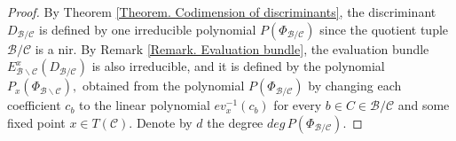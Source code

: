 \documentclass[11pt]{article}
\theoremstyle{plain}
\theoremstyle{definition}
\theoremstyle{remark}
\theoremstyle{plain}
\theoremstyle{plain}
\theoremstyle{plain}
\theoremstyle{definition}
\begin{document}
\begin{proof}
By Theorem \ref{Theorem. Codimension of discriminants}, the discriminant
$D_{\mathscr{B}/\mathscr{C}}$ is defined by one irreducible polynomial
$P(\Phi_{\mathscr{B}/\mathscr{C}})$ since the quotient tuple $\mathscr{B}/\mathscr{C}$
is a nir. By Remark \ref{Remark. Evaluation bundle}, the evaluation
bundle $E_{\mathscr{B}\backslash\mathscr{C}}^{x}(D_{\mathscr{B}/\mathscr{C}})$
is also irreducible, and it is defined by the polynomial $P_{x}(\Phi_{\mathscr{B}\backslash\mathscr{C}}),$
obtained from the polynomial $P(\Phi_{\mathscr{B}/\mathscr{C}})$
by changing each coefficient $c_{b}$ to the linear polynomial $ev_{x}^{-1}(c_{b})$
for every $b\in C\in\mathscr{B}/\mathscr{C}$ and some fixed point
$x\in T(\mathscr{C})$. Denote by $d$ the degree $deg\,P(\Phi_{\mathscr{B}/\mathscr{C}})$.


\end{proof}
\end{document}
